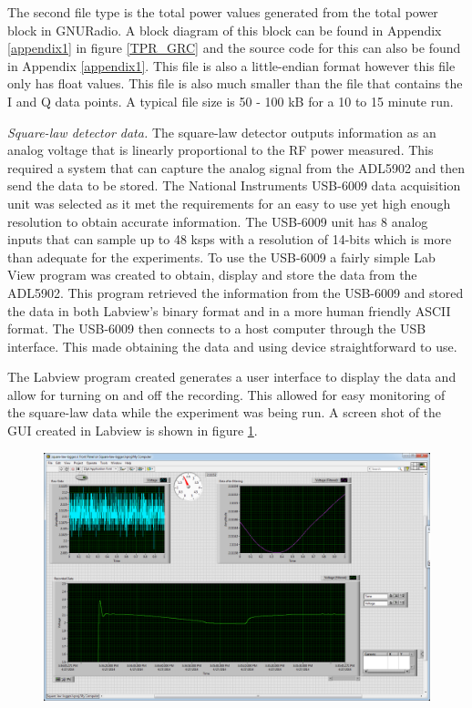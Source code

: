 The second file type is the total power values generated from the total power block in GNURadio.  A block diagram of this block can be found in Appendix \ref{appendix1} in figure \ref{TPR_GRC} and the source code for this can also be found in Appendix \ref{appendix1}.  This file is also a little-endian format however this file only has float values.  This file is also much smaller than the file that contains the I and Q data points.  A typical file size is 50 - 100 kB for a 10 to 15 minute run.  

\emph{Square-law detector data.}  The square-law detector outputs information as an analog voltage that is linearly proportional to the RF power measured.  This required a system that can capture the analog signal from the ADL5902 and then send the data to be stored.  The National Instruments USB-6009 data acquisition unit was selected as it met the requirements for an easy to use yet high enough resolution to obtain accurate information.  The USB-6009 unit has 8 analog inputs that can sample up to 48 ksps with a resolution of 14-bits which is more than adequate for the experiments.  To use the USB-6009 a fairly simple Lab View program was created to obtain, display and store the data from the ADL5902.  This program retrieved the information from the USB-6009 and stored the data in both Labview's binary format and in a more human friendly ASCII format.  The USB-6009 then connects to a host computer through the USB interface.  This made obtaining the data and using device straightforward to use.

The Labview program created generates a user interface to display the data and allow for turning on and off the recording.  This allowed for easy monitoring of the square-law data while the experiment was being run.  A screen shot of the GUI created in Labview is shown in figure \ref{labviewgui}.

{\begin{figure}[h!tb] \centering
\includegraphics[width=\textwidth]{Images/labviewGUI.png}
\label{labviewgui}
\end{figure}
}

